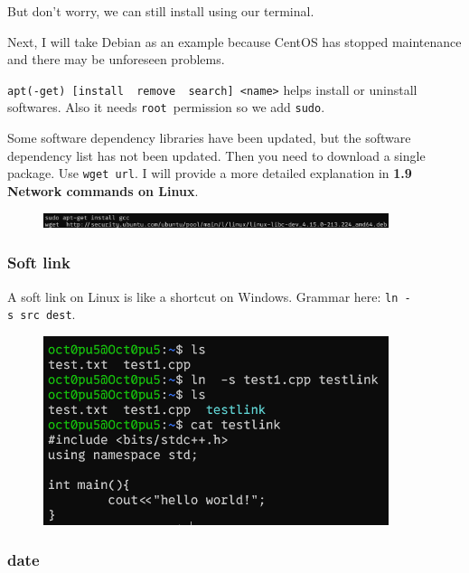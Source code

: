 \documentclass[12pt]{ctexart}
\begin{document}
But don't worry, we can still install using our
terminal.

Next, I will take Debian as an example because CentOS has stopped
maintenance and there may be unforeseen problems.

\texttt{apt(-get)\ {[}install\ \textbar{}\ remove\ \textbar{}\ search{]}\ \textless{}name\textgreater{}}
helps install or uninstall softwares. Also it needs \texttt{root}\
permission so we add \texttt{sudo}.

Some software dependency libraries have been updated, but the software
dependency list has not been updated. Then you need to download a single
package. Use \texttt{wget\ url}. I will provide a more detailed
explanation in \textbf{1.9 Network commands on Linux}.


\begin{figure}[H]
    \centering
    \includegraphics[width=0.9\textwidth,keepaspectratio]{assets/Linux/1.8 Some trivial contents on Linux/1.png}
\end{figure}

\subsubsection{\textbf{Soft link}}

A soft link on Linux is like a shortcut on Windows. Grammar here:
\texttt{ln\ -s\ src\ dest}.

\begin{figure}[H]
    \centering
    \includegraphics[width=0.9\textwidth,keepaspectratio]{assets/Linux/1.8 Some trivial contents on Linux/2.png}
\end{figure}

\subsubsection{\textbf{date}}
\end{document}
